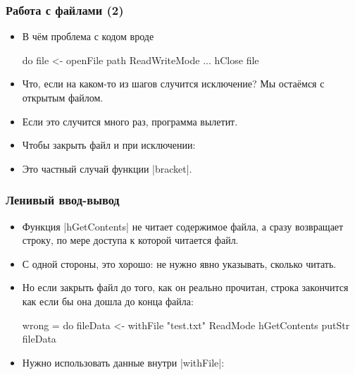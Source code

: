\documentclass[11pt]{beamer}
\begin{document}
\begin{frame}[fragile]
  \frametitle{Работа с файлами (2)}
  \begin{itemize}
    \item В чём проблема с кодом вроде
          \begin{haskell}
            do
              file <- openFile path ReadWriteMode
              ...
              hClose file
          \end{haskell}
          \pause
    \item Что, если на каком-то из шагов случится исключение? Мы остаёмся с открытым файлом.
    \item Если это случится много раз, программа вылетит.
          \pause
    \item Чтобы закрыть файл и при исключении:
    \item Это частный случай функции \haskinline|bracket|.
  \end{itemize}
\end{frame}

\begin{frame}[fragile]
  \frametitle{Ленивый ввод-вывод}
  \begin{itemize}
    \item Функция \haskinline|hGetContents| не читает содержимое файла, а сразу возвращает строку, по мере доступа к которой читается файл.
    \item С одной стороны, это хорошо: не нужно явно указывать, сколько читать.
    \item Но если закрыть файл до того, как он реально прочитан, строка закончится как если бы она дошла до конца файла:
          \begin{haskellsmall}
            wrong = do
              fileData <- withFile "test.txt" ReadMode hGetContents
              putStr fileData
          \end{haskellsmall}
    \item Нужно использовать данные внутри \haskinline|withFile|:
  \end{itemize}
\end{frame}
\end{document}
